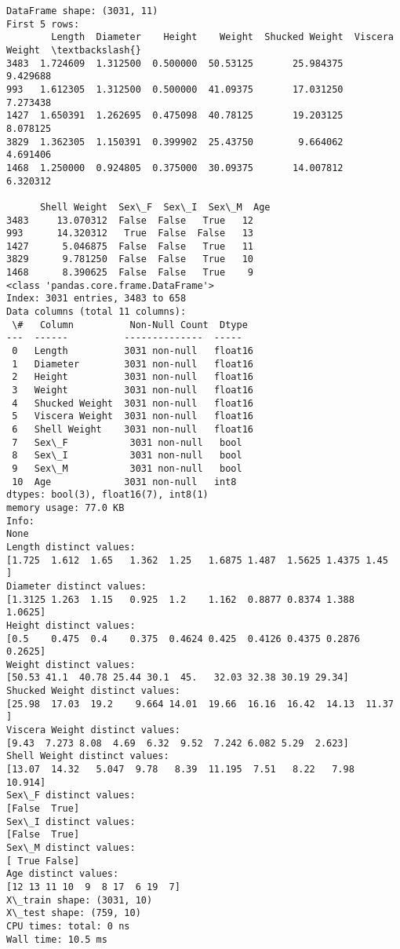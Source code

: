 \documentclass[11pt]{article}
\begin{document}
    \begin{Verbatim}[commandchars=\\\{\}]
DataFrame shape: (3031, 11)
First 5 rows:
        Length  Diameter    Height    Weight  Shucked Weight  Viscera Weight  \textbackslash{}
3483  1.724609  1.312500  0.500000  50.53125       25.984375        9.429688
993   1.612305  1.312500  0.500000  41.09375       17.031250        7.273438
1427  1.650391  1.262695  0.475098  40.78125       19.203125        8.078125
3829  1.362305  1.150391  0.399902  25.43750        9.664062        4.691406
1468  1.250000  0.924805  0.375000  30.09375       14.007812        6.320312

      Shell Weight  Sex\_F  Sex\_I  Sex\_M  Age
3483     13.070312  False  False   True   12
993      14.320312   True  False  False   13
1427      5.046875  False  False   True   11
3829      9.781250  False  False   True   10
1468      8.390625  False  False   True    9
<class 'pandas.core.frame.DataFrame'>
Index: 3031 entries, 3483 to 658
Data columns (total 11 columns):
 \#   Column          Non-Null Count  Dtype
---  ------          --------------  -----
 0   Length          3031 non-null   float16
 1   Diameter        3031 non-null   float16
 2   Height          3031 non-null   float16
 3   Weight          3031 non-null   float16
 4   Shucked Weight  3031 non-null   float16
 5   Viscera Weight  3031 non-null   float16
 6   Shell Weight    3031 non-null   float16
 7   Sex\_F           3031 non-null   bool
 8   Sex\_I           3031 non-null   bool
 9   Sex\_M           3031 non-null   bool
 10  Age             3031 non-null   int8
dtypes: bool(3), float16(7), int8(1)
memory usage: 77.0 KB
Info:
None
Length distinct values:
[1.725  1.612  1.65   1.362  1.25   1.6875 1.487  1.5625 1.4375 1.45  ]
Diameter distinct values:
[1.3125 1.263  1.15   0.925  1.2    1.162  0.8877 0.8374 1.388  1.0625]
Height distinct values:
[0.5    0.475  0.4    0.375  0.4624 0.425  0.4126 0.4375 0.2876 0.2625]
Weight distinct values:
[50.53 41.1  40.78 25.44 30.1  45.   32.03 32.38 30.19 29.34]
Shucked Weight distinct values:
[25.98  17.03  19.2    9.664 14.01  19.66  16.16  16.42  14.13  11.37 ]
Viscera Weight distinct values:
[9.43  7.273 8.08  4.69  6.32  9.52  7.242 6.082 5.29  2.623]
Shell Weight distinct values:
[13.07  14.32   5.047  9.78   8.39  11.195  7.51   8.22   7.98  10.914]
Sex\_F distinct values:
[False  True]
Sex\_I distinct values:
[False  True]
Sex\_M distinct values:
[ True False]
Age distinct values:
[12 13 11 10  9  8 17  6 19  7]
X\_train shape: (3031, 10)
X\_test shape: (759, 10)
CPU times: total: 0 ns
Wall time: 10.5 ms
    \end{Verbatim}
\end{document}
